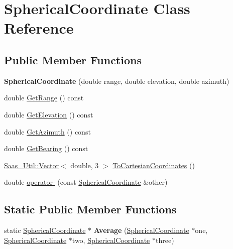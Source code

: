 \hypertarget{class_spherical_coordinate}{}\section{Spherical\+Coordinate Class Reference}
\label{class_spherical_coordinate}
\subsection*{Public Member Functions}
\begin{DoxyCompactItemize}
\item 
\hypertarget{class_spherical_coordinate_a4451cabbfd371d20d6d9bbd8c6c4a1da}{}{\bfseries Spherical\+Coordinate} (double range, double elevation, double azimuth)\label{class_spherical_coordinate_a4451cabbfd371d20d6d9bbd8c6c4a1da}

\item 
double \hyperlink{class_spherical_coordinate_add9bb7fba236fff7dac1ca73999e7132}{Get\+Range} () const 
\item 
double \hyperlink{class_spherical_coordinate_a22950a0271fd4c1e67023070721b20d7}{Get\+Elevation} () const 
\item 
double \hyperlink{class_spherical_coordinate_a7ae4d23db54763ba8359e9fdf45bcaba}{Get\+Azimuth} () const 
\item 
double \hyperlink{class_spherical_coordinate_abdfd0d2b1679b2d65d1cf246b62dbae2}{Get\+Bearing} () const 
\item 
\hyperlink{class_saas___util_1_1_vector}{Saas\+\_\+\+Util\+::\+Vector}$<$ double, 3 $>$ \hyperlink{class_spherical_coordinate_aa66b4f4e9d88acd64f7e690fa5b924f6}{To\+Cartesian\+Coordinates} ()
\item 
double \hyperlink{class_spherical_coordinate_ae059f99fee575e9707e665442cad3f7f}{operator-\/} (const \hyperlink{class_spherical_coordinate}{Spherical\+Coordinate} \&other)
\end{DoxyCompactItemize}
\subsection*{Static Public Member Functions}
\begin{DoxyCompactItemize}
\item 
\hypertarget{class_spherical_coordinate_af79023c7973079fd2b4bf573bd34cb30}{}static \hyperlink{class_spherical_coordinate}{Spherical\+Coordinate} $\ast$ {\bfseries Average} (\hyperlink{class_spherical_coordinate}{Spherical\+Coordinate} $\ast$one, \hyperlink{class_spherical_coordinate}{Spherical\+Coordinate} $\ast$two, \hyperlink{class_spherical_coordinate}{Spherical\+Coordinate} $\ast$three)\label{class_spherical_coordinate_af79023c7973079fd2b4bf573bd34cb30}

\end{DoxyCompactItemize}


